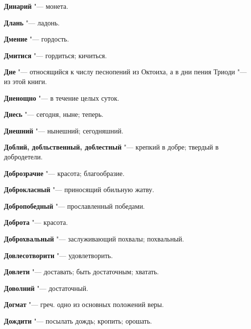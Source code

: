 \begin{mymulticols}{2}
\noindent\textbf{Динарий} "--- монета. 




\noindent\textbf{Длань} "--- ладонь. 




\noindent\textbf{Дмение} "--- гордость. 




\noindent\textbf{Дмитися} "--- гордиться; кичиться. 




\noindent\textbf{Дне} "--- относящийся к числу песнопений из Октоиха, а в дни пения Триоди "--- из этой книги. 




\noindent\textbf{Дненощно} "--- в течение целых суток. 




\noindent\textbf{Днесь} "--- сегодня, ныне; теперь. 




\noindent\textbf{Днешний} "--- нынешний; сегодняшний. 




\noindent\textbf{Доблий, добльственный, доблестный} "--- крепкий в добре; твердый в добродетели. 




\noindent\textbf{Доброзрачие} "--- красота; благообразие. 




\noindent\textbf{Доброкласный} "--- приносящий обильную жатву. 




\noindent\textbf{Добропобедный} "--- прославленный победами. 




\noindent\textbf{Доброта} "--- красота. 




\noindent\textbf{Доброхвальный} "--- заслуживающий похвалы; похвальный. 




\noindent\textbf{Довлесотворити} "--- удовлетворить. 




\noindent\textbf{Довлети} "--- доставать; быть достаточным; хватать. 




\noindent\textbf{Доволний} "--- достаточный. 




\noindent\textbf{Догмат} "--- греч. одно из основных положений веры. 




\noindent\textbf{Дождити} "--- посылать дождь; кропить; орошать. 





\end{mymulticols}
